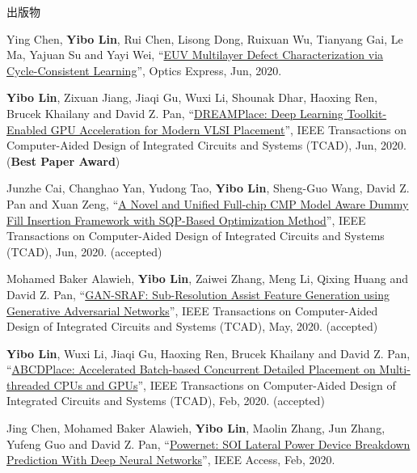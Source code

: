 \begin{rSection}{出版物}
\begin{description}[font=\normalfont]
\item[{[J22]}]{
        Ying Chen, \textbf{Yibo Lin}, Rui Chen, Lisong Dong, Ruixuan Wu, Tianyang Gai, Le Ma, Yajuan Su and Yayi Wei, 
    ``\href{https://doi.org/10.1364/OE.394590}{EUV Multilayer Defect Characterization via Cycle-Consistent Learning}'', 
    Optics Express, Jun, 2020.
    
}
            

\item[{[J21]}]{
        \textbf{Yibo Lin}, Zixuan Jiang, Jiaqi Gu, Wuxi Li, Shounak Dhar, Haoxing Ren, Brucek Khailany and David Z. Pan, 
    ``\href{https://doi.org/10.1109/TCAD.2020.3003843}{DREAMPlace: Deep Learning Toolkit-Enabled GPU Acceleration for Modern VLSI Placement}'', 
    IEEE Transactions on Computer-Aided Design of Integrated Circuits and Systems (TCAD), Jun, 2020.
    (\textbf{Best Paper Award})
}
            

\item[{[J20]}]{
        Junzhe Cai, Changhao Yan, Yudong Tao, \textbf{Yibo Lin}, Sheng-Guo Wang, David Z. Pan and Xuan Zeng, 
    ``\href{https://doi.org/10.1109/TCAD.2020.3001380}{A Novel and Unified Full-chip CMP Model Aware Dummy Fill Insertion Framework with SQP-Based Optimization Method}'', 
    IEEE Transactions on Computer-Aided Design of Integrated Circuits and Systems (TCAD), Jun, 2020.
    (accepted)
}
            

\item[{[J19]}]{
        Mohamed Baker Alawieh, \textbf{Yibo Lin}, Zaiwei Zhang, Meng Li, Qixing Huang and David Z. Pan, 
    ``\href{https://doi.org/10.1109/TCAD.2020.2995338}{GAN-SRAF: Sub-Resolution Assist Feature Generation using Generative Adversarial Networks}'', 
    IEEE Transactions on Computer-Aided Design of Integrated Circuits and Systems (TCAD), May, 2020.
    (accepted)
}
            

\item[{[J18]}]{
        \textbf{Yibo Lin}, Wuxi Li, Jiaqi Gu, Haoxing Ren, Brucek Khailany and David Z. Pan, 
    ``\href{https://doi.org/10.1109/TCAD.2020.2971531}{ABCDPlace: Accelerated Batch-based Concurrent Detailed Placement on Multi-threaded CPUs and GPUs}'', 
    IEEE Transactions on Computer-Aided Design of Integrated Circuits and Systems (TCAD), Feb, 2020.
    (accepted)
}
            

\item[{[J17]}]{
        Jing Chen, Mohamed Baker Alawieh, \textbf{Yibo Lin}, Maolin Zhang, Jun Zhang, Yufeng Guo and David Z. Pan, 
    ``\href{https://doi.org/10.1109/ACCESS.2020.2970966}{Powernet: SOI Lateral Power Device Breakdown Prediction With Deep Neural Networks}'', 
    IEEE Access, Feb, 2020.
    
}
\end{description}
\end{rSection}
